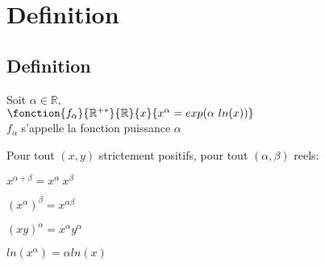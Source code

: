 \documentclass[12pt,twoside,a4paper]{article}
\author{MPSI 2}
\begin{document}
	\maketitle
	\section{Definition}
		\subsection{Definition}
			\begin{defi}
				Soit $\alpha\in\mathbb{R},$\\
				$\fonction{f_\alpha}{\mathbb{R}^{+*}}{\mathbb{R}}{x}{x^\alpha=exp(\alpha\ ln(x))}$\\
				$f_\alpha$ s'appelle la fonction puissance $\alpha$
			\end{defi}
			\begin{prop}
				Pour tout $(x,y)$ strictement positifs, pour tout $(\alpha,\beta)$ reels:\\
				\begin{liste}
					\item $x^{\alpha+\beta}=x^\alpha\ x^\beta$
					\item $\left(x^\alpha\right)^\beta=x^{\alpha\beta}$
					\item $(xy)^\alpha=x^\alpha y^\alpha$
					\item $ln\left(x^\alpha\right)=\alpha ln(x)$
				\end{liste}
			\end{prop}
\end{document}
